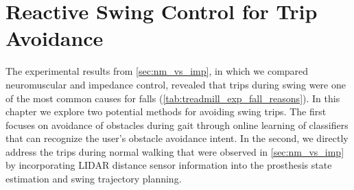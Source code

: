 \chapter{Reactive Swing Control for Trip Avoidance}\label{sec:trip_avoidance}
\graphicspath{{chapters/trip_avoidance/figures/}}

The experimental results from \cref{sec:nm_vs_imp}, in which we compared
neuromuscular and impedance control, revealed that trips during swing were one
of the most common causes for falls (\cref{tab:treadmill_exp_fall_reasons}). In
this chapter we explore two potential methods for avoiding swing trips. The
first focuses on avoidance of obstacles during gait through online learning of
classifiers that can recognize the user's obstacle avoidance intent. In the
second, we directly address the trips during normal walking that were observed
in \cref{sec:nm_vs_imp} by incorporating LIDAR distance sensor information into
the prosthesis state estimation and swing trajectory planning.









